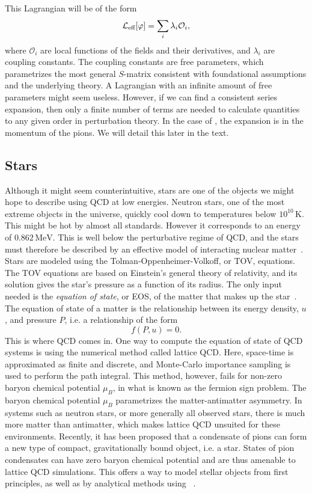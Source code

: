 This Lagrangian will be of the form
\begin{equation}
    \mathcal{L}_\text{eff}[\varphi] = \sum_i \lambda_i \mathcal O_i,
\end{equation}
where $\mathcal O_i$ are local functions of the fields and their derivatives, and $\lambda_i$ are coupling constants.
The coupling constants are free parameters, which parametrizes the most general $S$-matrix consistent with foundational assumptions and the underlying theory.
A Lagrangian with an infinite amount of free parameters might seem useless. 
However, if we can find a consistent series expansion, then only a finite number of terms are needed to calculate quantities to any given order in perturbation theory.
In the case of \chpt, the expansion is in the momentum of the pions.
We will detail this later in the text.


\subsection*{Stars}

Although it might seem counterintuitive, stars are one of the objects we might hope to describe using QCD at low energies.
Neutron stars, one of the most extreme objects in the universe, quickly cool down to temperatures below $10^{10} \, \text{K}$.
This might be hot by almost all standards. 
However it corresponds to an energy of $0.862 \, \text{MeV}$.
This is well below the perturbative regime of QCD, and the stars must therefore be described by an effective model of interacting nuclear matter~\cite{glendenning:compcat_stars,from_hadrons_to_quarks}.
Stars are modeled using the Tolman-Oppenheimer-Volkoff, or TOV, equations.
The TOV equations are based on Einstein's general theory of relativity, and its solution gives the star's pressure as a function of its radius.
The only input needed is the \emph{equation of state}, or EOS, of the matter that makes up the star~\cite{Carroll:spacetime}.
The equation of state of a matter is the relationship between its energy density, $u$, and pressure $P$, i.e. a relationship of the form
\begin{equation}
    f(P, u) = 0.
\end{equation}
This is where QCD comes in.
One way to compute the equation of state of QCD systems is using the numerical method called lattice QCD.
Here, space-time is approximated as finite and discrete, and Monte-Carlo importance sampling is used to perform the path integral.
This method, however, fails for non-zero baryon chemical potential $\mu_B$, in what is known as the fermion sign problem.
The baryon chemical potential $\mu_B$ parametrizes the matter-antimatter asymmetry.
In systems such as neutron stars, or more generally all observed stars, there is much more matter than antimatter, which makes lattice QCD unsuited for these environments.
Recently, it has been proposed that a condensate of pions can form a new type of compact, gravitationally bound object, i.e. a star.
States of pion condensates can have zero baryon chemical potential and are thus amenable to lattice QCD simulations.
This offers a way to model stellar objects from first principles, as well as by analytical methods using \chpt~\cite{new_clas_of_compact_stars,andersen:bose_einstein}.


